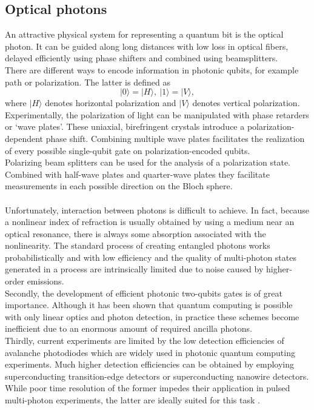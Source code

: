 \subsection{Optical photons}
An attractive physical system for representing a quantum bit is the optical photon. It can be guided along long distances with low loss in optical fibers, delayed efficiently using phase shifters and combined using beamsplitters. \\
There are different ways to encode information in photonic qubits, for example path or polarization. The latter is defined as
\begin{equation}
    |0\rangle = |H\rangle, \ |1\rangle = |V\rangle,
\end{equation}
where $|H\rangle$ denotes horizontal polarization and $|V\rangle$ denotes vertical polarization. \\
Experimentally, the polarization of light can be manipulated with phase retarders or ‘wave plates'. These uniaxial, birefringent crystals introduce a polarization-dependent phase shift. Combining multiple wave plates facilitates the realization of every possible single-qubit gate
on polarization-encoded qubits. \\
Polarizing beam splitters can be used for the analysis of a polarization state. Combined with half-wave plates and quarter-wave plates they facilitate measurements in each possible direction on the Bloch sphere. \\
\\
Unfortunately, interaction between photons is difficult to achieve. In fact, because a nonlinear index of refraction is usually obtained by using a medium near an optical resonance, there is always some absorption associated with the nonlinearity. The standard process of creating entangled photons works probabilistically and with low efficiency and the quality of multi-photon states generated in a process are intrinsically limited due to noise caused by higher-order emissions. \\
Secondly, the development of efficient photonic two-qubits gates is of great importance. Although it has been shown that quantum computing is possible with only linear optics and photon detection, in practice these schemes become inefficient due to an enormous amount of required
ancilla photons. \\
Thirdly, current experiments are limited by the low detection efficiencies of avalanche photodiodes which are widely used in photonic quantum computing experiments. Much higher detection efficiencies can be obtained by employing superconducting transition-edge detectors or superconducting nanowire detectors. While poor time resolution of the former impedes their application in pulsed multi-photon experiments, the latter are ideally suited for this task \cite{BibEntry2016Jul}.

